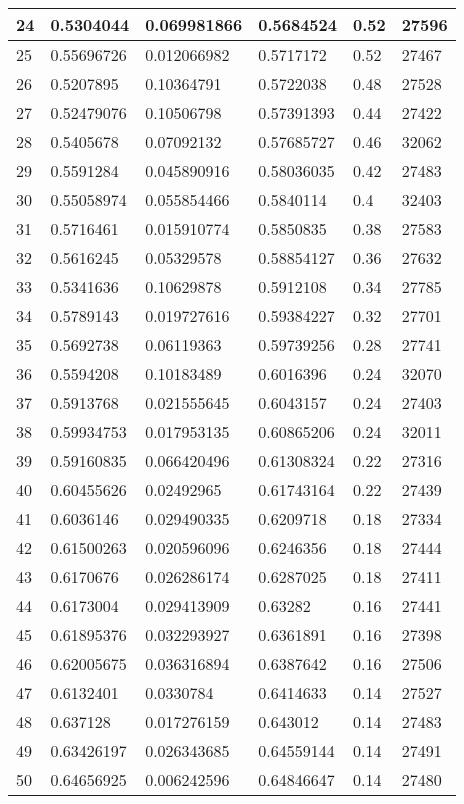 \begin{longtable}{|l|l|l|l|l|l|}
24 & 0.5304044 & 0.069981866 & 0.5684524 & 0.52 & 27596 \\ \hline 
25 & 0.55696726 & 0.012066982 & 0.5717172 & 0.52 & 27467 \\ \hline 
26 & 0.5207895 & 0.10364791 & 0.5722038 & 0.48 & 27528 \\ \hline 
27 & 0.52479076 & 0.10506798 & 0.57391393 & 0.44 & 27422 \\ \hline 
28 & 0.5405678 & 0.07092132 & 0.57685727 & 0.46 & 32062 \\ \hline 
29 & 0.5591284 & 0.045890916 & 0.58036035 & 0.42 & 27483 \\ \hline 
30 & 0.55058974 & 0.055854466 & 0.5840114 & 0.4 & 32403 \\ \hline 
31 & 0.5716461 & 0.015910774 & 0.5850835 & 0.38 & 27583 \\ \hline 
32 & 0.5616245 & 0.05329578 & 0.58854127 & 0.36 & 27632 \\ \hline 
33 & 0.5341636 & 0.10629878 & 0.5912108 & 0.34 & 27785 \\ \hline 
34 & 0.5789143 & 0.019727616 & 0.59384227 & 0.32 & 27701 \\ \hline 
35 & 0.5692738 & 0.06119363 & 0.59739256 & 0.28 & 27741 \\ \hline 
36 & 0.5594208 & 0.10183489 & 0.6016396 & 0.24 & 32070 \\ \hline 
37 & 0.5913768 & 0.021555645 & 0.6043157 & 0.24 & 27403 \\ \hline 
38 & 0.59934753 & 0.017953135 & 0.60865206 & 0.24 & 32011 \\ \hline 
39 & 0.59160835 & 0.066420496 & 0.61308324 & 0.22 & 27316 \\ \hline 
40 & 0.60455626 & 0.02492965 & 0.61743164 & 0.22 & 27439 \\ \hline 
41 & 0.6036146 & 0.029490335 & 0.6209718 & 0.18 & 27334 \\ \hline 
42 & 0.61500263 & 0.020596096 & 0.6246356 & 0.18 & 27444 \\ \hline 
43 & 0.6170676 & 0.026286174 & 0.6287025 & 0.18 & 27411 \\ \hline 
44 & 0.6173004 & 0.029413909 & 0.63282 & 0.16 & 27441 \\ \hline 
45 & 0.61895376 & 0.032293927 & 0.6361891 & 0.16 & 27398 \\ \hline 
46 & 0.62005675 & 0.036316894 & 0.6387642 & 0.16 & 27506 \\ \hline 
47 & 0.6132401 & 0.0330784 & 0.6414633 & 0.14 & 27527 \\ \hline 
48 & 0.637128 & 0.017276159 & 0.643012 & 0.14 & 27483 \\ \hline 
49 & 0.63426197 & 0.026343685 & 0.64559144 & 0.14 & 27491 \\ \hline 
50 & 0.64656925 & 0.006242596 & 0.64846647 & 0.14 & 27480 \\ \hline 
\end{longtable}
